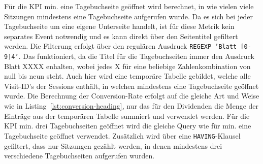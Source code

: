 Für die KPI \glqq min. eine Tagebuchseite geöffnet\grqq{} wird berechnet, in wie vielen viele Sitzungen mindestens eine Tagebuchseite aufgerufen wurde. Da es sich bei jeder Tagebuchseite um eine eigene Unterseite handelt, ist für diese Metrik kein separates Event notwendig und es kann direkt über den Seitentitel gefiltert werden. Die Filterung erfolgt über den regulären Ausdruck \texttt{REGEXP 'Blatt [0-9]{4}'}. Das funktioniert, da die Titel für die Tagebuchseiten immer den Ausdruck \glqq Blatt XXXX\grqq{} enhalten, wobei jedes \glqq X\grqq{} für eine beliebige Zahlenkombination von null bis neun steht. Auch hier wird eine temporäre Tabelle gebildet, welche alle Visit-ID's der Sessions enthält, in welchen mindestens eine Tagebuchseite geöffnet wurde. Die Berechnung der Conversion-Rate erfolgt auf die gleiche Art und Weise wie in Listing~\ref{lst:conversion-heading}, nur das für den Dividenden die Menge der Einträge aus der temporären Tabelle summiert und verwendet werden. Für die KPI \glqq min. drei Tagebuchseiten geöffnet\grqq{} wird die gleiche Query wie für \glqq min. eine Tagebuchseite geöffnet\grqq{} verwendet. Zusätzlich wird über eine \texttt{HAVING}-Klausel gefiltert, dass nur Sitzungen gezählt werden, in denen mindestens drei verschiedene Tagebuchseiten aufgerufen wurden.

